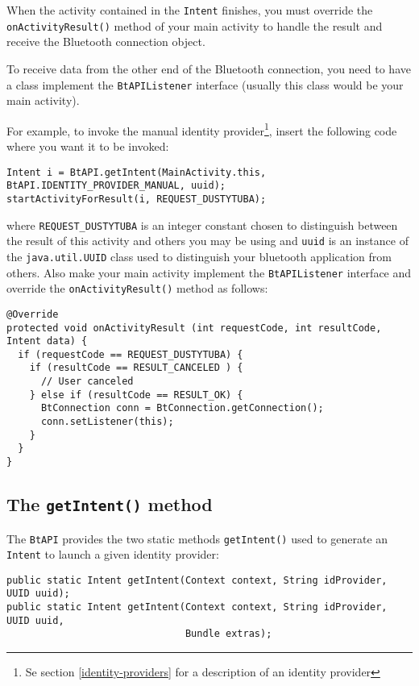 \documentclass[a4paper,11pt]{article}
\begin{document}
When the activity contained in the \verb+Intent+ finishes, you must override the \verb+onActivityResult()+ method of your main activity to handle the result and receive the Bluetooth connection object.

To receive data from the other end of the Bluetooth connection, you need to have a class implement the \verb+BtAPIListener+ interface (usually this class would be your main activity).

For example, to invoke the manual identity provider\footnote{Se section \ref{identity-providers} for a description of an identity provider}, insert the following code where you want it to be invoked:

\footnotesize
\begin{verbatim}
Intent i = BtAPI.getIntent(MainActivity.this, BtAPI.IDENTITY_PROVIDER_MANUAL, uuid);
startActivityForResult(i, REQUEST_DUSTYTUBA);
\end{verbatim}
\normalsize

where \verb+REQUEST_DUSTYTUBA+ is an integer constant chosen to distinguish between the result of this activity and others you may be using and \verb+uuid+ is an instance of the \verb+java.util.UUID+ class used to distinguish your bluetooth application from others. Also make your main activity implement the \verb+BtAPIListener+ interface and override the \verb+onActivityResult()+ method as follows:

\footnotesize
\begin{verbatim}
@Override
protected void onActivityResult (int requestCode, int resultCode, Intent data) {
  if (requestCode == REQUEST_DUSTYTUBA) {
    if (resultCode == RESULT_CANCELED ) {
      // User canceled
    } else if (resultCode == RESULT_OK) {
      BtConnection conn = BtConnection.getConnection(); 
      conn.setListener(this);
    }
  }
}
\end{verbatim}
\normalsize

\subsection{The {\tt getIntent()} method}
\label{getIntent}
The \verb+BtAPI+ provides the two static methods \verb+getIntent()+ used to generate an \verb+Intent+ to launch a given identity provider:

\footnotesize
\begin{verbatim}
public static Intent getIntent(Context context, String idProvider, UUID uuid);
public static Intent getIntent(Context context, String idProvider, UUID uuid, 
                               Bundle extras);
\end{verbatim}
\normalsize
\end{document}
